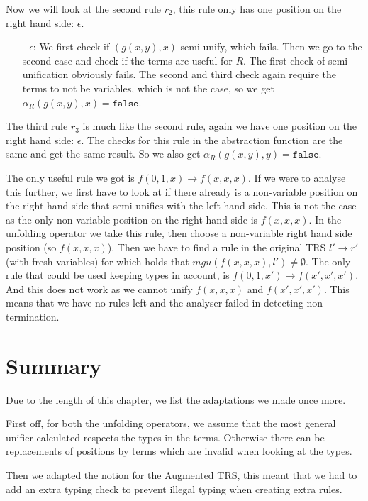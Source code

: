 Now we will look at the second rule $r_2$, this rule only has one position on the right hand side: $\epsilon$.
\begin{itemize}
    \itemsep 0em
    \item[-] $\epsilon$: We first check if $(g(x, y), x)$ semi-unify, which fails. Then we go to the second case and check if the terms are useful for $R$. The first check of semi-unification obviously fails. The second and third check again require the terms to not be variables, which is not the case, so we get $\alpha_R(g(x,y), x) = \texttt{false}$.
\end{itemize}
The third rule $r_3$ is much like the second rule, again we have one position on the right hand side: $\epsilon$. The checks for this rule in the abstraction function are the same and get the same result. So we also get $\alpha_R(g(x,y), y) = \texttt{false}$.

\noindent The only useful rule we got is $f(0, 1, x) \rightarrow f(x,x,x)$. If we were to analyse this further, we first have to look at if there already is a non-variable position on the right hand side that semi-unifies with the left hand side. This is not the case as the only non-variable position on the right hand side is $f(x, x, x)$. In the unfolding operator we take this rule, then choose a non-variable right hand side position (so $f(x,x,x)$). Then we have to find a rule in the original TRS $l' \rightarrow r'$ (with fresh variables) for which holds that $\textit{mgu}(f(x,x,x), l') \neq \emptyset$. The only rule that could be used keeping types in account, is $f(0, 1, x') \rightarrow f(x', x', x')$. And this does not work as we cannot unify $f(x,x,x)$ and $f(x', x', x')$. This means that we have no rules left and the analyser failed in detecting non-termination. 

\section*{Summary}
Due to the length of this chapter, we list the adaptations we made once more.  

First off, for both the unfolding operators, we assume that the most general unifier calculated respects the types in the terms. Otherwise there can be replacements of positions by terms which are invalid when looking at the types.  

Then we adapted the notion for the Augmented TRS, this meant that we had to add an extra typing check to prevent illegal typing when creating extra rules.

